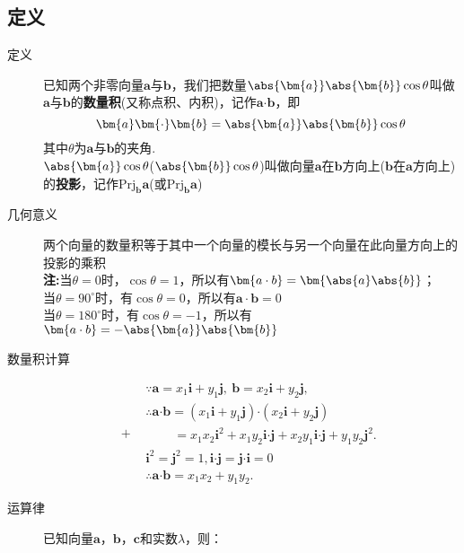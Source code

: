 \begin{Theorem}[平面向量基本定理]
  \subsection{定义}
    \begin{description}
      \item[定义] 已知两个非零向量$ \bm{a} $与$\bm{b}$，我们把数量$ \abs{\bm{a}}\abs{\bm{b}}\cos\theta $叫做$ \bm{a} $与$ \bm{b} $的\textbf{数量积}(又称点积、内积)，记作$ \bm{a}\bm{\cdot}\bm{b} $，即\[\bm{a}\bm{\cdot}\bm{b}=\abs{\bm{a}}\abs{\bm{b}}\cos\theta\]
      其中$ \theta $为$ \bm{a} $与$ \bm{b} $的夹角.\\
      $\abs{\bm{a}}\cos\theta$($\abs{\bm{b}}\cos\theta$)叫做向量$\bm a$在$\bm b$方向上($\bm b$在$\bm a$方向上)的\textbf{投影}，记作$\mathrm{Prj}_{\bm b}{\bm a}$(或$\mathrm{Prj}_{\bm b}{\bm a}$)
      \item[几何意义] 两个向量的数量积等于其中一个向量的模长与另一个向量在此向量方向上的投影的乘积\\%
      {\kaishu \textbf{注:}当$ \theta=0 $时，$ \cos\theta=1 $，所以有$ \bm{a\cdot b}=\bm{\abs{a}\abs{b}} $；\\\phantom{注:\ }当$ \theta=90^{\circ} $时，有$ \cos\theta =0$，所以有$ \bm{a\cdot b}=0 $ \\\phantom{注:\ }当$ \theta=180^{\circ} $时，有$ \cos\theta =-1$，所以有$ \bm{a\cdot b}=-\abs{\bm{a}}\abs{\bm{b}} $   }
      \item[数量积计算]
      \begin{equation*}+
      \begin{aligned}
      &\because \bm{a}=x_1\bm{i}+y_1\bm{j},~\bm{b}=x_2\bm{i}+y_2\bm{j},\\
      &\therefore \bm{a}\bm{\cdot}\bm{b}=(x_1\bm{i}+y_1\bm{j})\bm{\cdot}(x_2\bm{i}+y_2\bm{j})\\
      &\phantom{\therefore\bm{a}\bm{\cdot}\bm{b}~}=x_1x_2\bm{i}^2+x_1y_2\bm{i}\bm{\cdot}\bm{j}+x_2y_1\bm{i}\bm{\cdot}\bm{j}+y_1y_2\bm{j}^2.\\
      & \bm{i}^2=\bm{j}^2=1,\bm{i}\bm{\cdot}\bm{j}=\bm{j}\bm{\cdot}\bm{i}=0\\
      &\therefore \bm{a}\bm{\cdot}\bm{b}=x_1x_2+y_1y_2.
      \end{aligned}
      \end{equation*}
      \item[运算律]已知向量$\bm a$，$\bm b$，$\bm c$和实数$\lambda$，则：

\end{description}
\end{Theorem}
